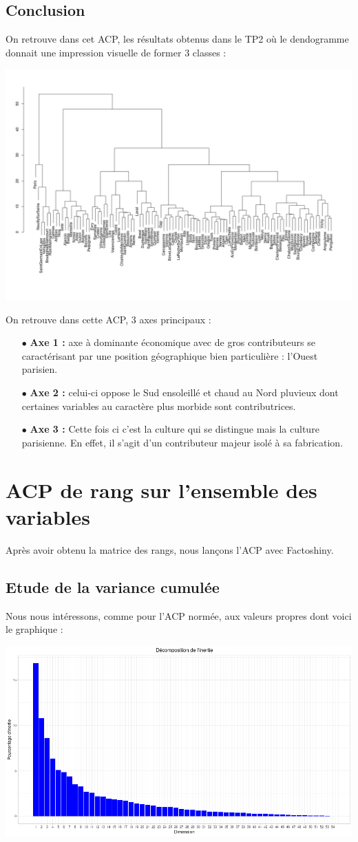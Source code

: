 \documentclass{article}
\begin{document}
\subsection{Conclusion}

On retrouve dans cet ACP, les résultats obtenus dans le TP2 où le dendogramme donnait une impression visuelle de former 3 classes : 

\centerline{\includegraphics[width=0.5\linewidth]{images/Dendo}} 

On retrouve dans cette ACP, 3 axes principaux : 
\begin{itemize}
\item[$\bullet$] \textbf{Axe 1 :} axe à dominante économique avec de gros contributeurs se caractérisant par une position géographique bien particulière : l'Ouest parisien. 
\item[$\bullet$]  \textbf{Axe 2 :} celui-ci oppose le Sud ensoleillé et chaud au Nord pluvieux dont certaines variables au caractère plus morbide sont contributrices. 
\item[$\bullet$] \textbf{Axe 3 :} Cette fois ci c'est la culture qui se distingue mais la culture parisienne. En effet, il s'agit d'un contributeur majeur isolé à sa fabrication.  
\end{itemize}

\section{ACP de rang sur l'ensemble des variables}

Après avoir obtenu la matrice des rangs, nous lançons l'ACP avec Factoshiny. 

	\subsection{Etude de la variance cumulée}
	
Nous nous intéressons, comme pour l'ACP normée, aux valeurs propres dont voici le graphique :
	
\centerline{\includegraphics[width=0.8\linewidth]{images/ACPR_vp}}
\end{document}
